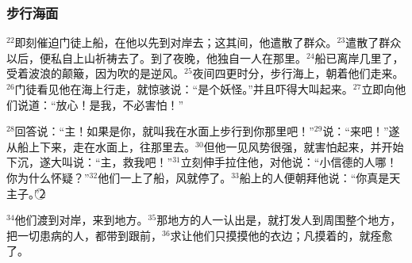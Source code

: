 \subsubsection{步行海面}
$^{22}$\UL[耶稣]即刻催迫门徒上船，在他以先到对岸去；这其间，他遣散了群众。$^{23}$\UL[耶稣]遣散了群众以后，便私自上山祈祷去了。到了夜晚，他独自一人在那里。$^{24}$船已离岸几里了，受着波浪的颠簸，因为吹的是逆风。$^{25}$夜间四更时分，\UL[耶稣]步行海上，朝着他们走来。$^{26}$门徒看见他在海上行走，就惊骇说：“是个妖怪。”并且吓得大叫起来。$^{27}$\UL[耶稣]立即向他们说道：“放心！是我，不必害怕！”

$^{28}$\UL[伯多禄]回答说：“主！如果是你，就叫我在水面上步行到你那里吧！”$^{29}$\UL[耶稣]说：“来吧！”\UL[伯多禄]遂从船上下来，走在水面上，往\UL[耶稣]那里去。$^{30}$但他一见风势很强，就害怕起来，并开始下沉，遂大叫说：“主，救我吧！”$^{31}$\UL[耶稣]立刻伸手拉住他，对他说：“小信德的人哪！你为什么怀疑？”$^{32}$他们一上了船，风就停了。$^{33}$船上的人便朝拜他说：“你真是天主子。”\textcircled{2}

$^{34}$他们渡到对岸，来到\UL[革乃撒勒]地方。$^{35}$那地方的人一认出是\UL[耶稣]，就打发人到周围整个地方，把一切患病的人，都带到\UL[耶稣]跟前，$^{36}$求\UL[耶稣]让他们只摸摸他的衣边；凡摸着的，就痊愈了。


